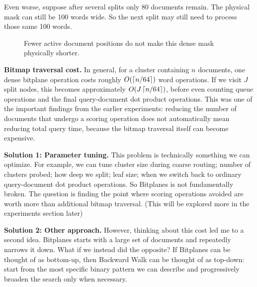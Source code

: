 Even worse, suppose after several splits only 80 documents remain. The physical mask can
still be 100 words wide. So the next split may still need to process those same 100 words.

\begin{figure}[H]\centering
{}
\caption{Fewer active document positions do not make this dense mask physically shorter.}
\end{figure}

\textbf{Bitmap traversal cost.} In general, for a cluster containing $n$ documents, one dense
bitplane operation costs roughly $O(\left\lceil n/64\right\rceil)$ word operations. If we visit $J$ split
nodes, this becomes approximately $O(J\left\lceil n/64\right\rceil)$, before even counting queue operations
and the final query-document dot product operations. This was one of the important findings from the earlier
experiments: reducing the number of documents that undergo a scoring operation does not automatically mean
reducing total query time, because the bitmap traversal itself can become expensive.

\textbf{Solution 1: Parameter tuning.} This problem is technically something we can optimize.
For example, we can tune cluster size during coarse routing; number of clusters probed;
how deep we split; leaf size; when we switch back to ordinary query-document dot product operations. So Bitplanes
is not fundamentally broken. The question is finding the point where scoring operations avoided are
worth more than additional bitmap traversal. (This will be explored more in the experiments section later)

\textbf{Solution 2: Other approach.} However, thinking about this cost led me to a second idea.
Bitplanes starts with a large set of documents and repeatedly narrows it down. What if we
instead did the opposite? If Bitplanes can be thought of as bottom-up, then Backward Walk
can be thought of as top-down: start from the most specific binary pattern we can describe
and progressively broaden the search only when necessary.

